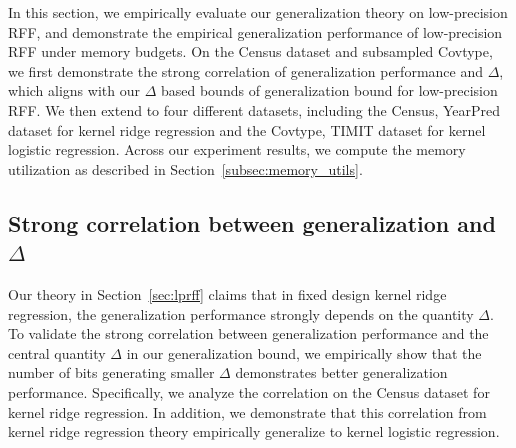 In this section, we empirically evaluate our generalization theory on low-precision RFF, and demonstrate the empirical generalization performance of low-precision RFF under memory budgets. On the Census dataset and subsampled Covtype, we first demonstrate the strong correlation of generalization performance and $\Delta$, which aligns with our $\Delta$ based bounds of generalization bound for low-precision RFF. We then extend to four different datasets, including the Census, YearPred dataset for kernel ridge regression and the Covtype, TIMIT dataset for kernel logistic regression. Across our experiment results, we compute the memory utilization as described in Section~\ref{subsec:memory_utils}.

\subsection{Strong correlation between generalization and $\Delta$}
Our theory in Section~\ref{sec:lprff} claims that in fixed design kernel ridge regression, the generalization performance strongly depends on the quantity $\Delta$.
To validate the strong correlation between generalization performance and the central quantity $\Delta$ in our generalization bound, we empirically show that the number of bits generating smaller $\Delta$ demonstrates better generalization performance. 
Specifically, we analyze the correlation on the Census dataset for kernel ridge regression. In addition, we demonstrate that this correlation from kernel ridge regression theory empirically generalize to kernel logistic regression. 

